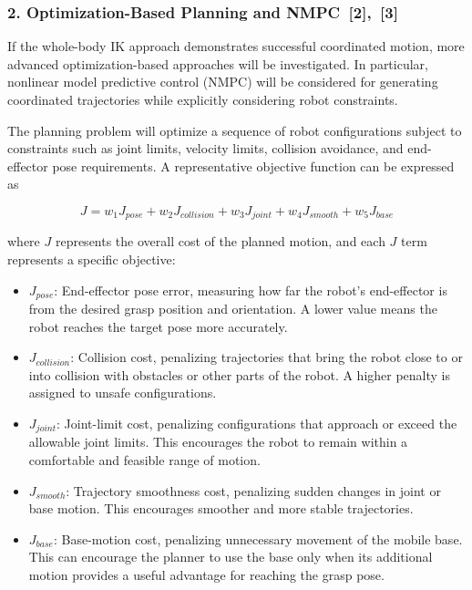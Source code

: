 \documentclass[12pt,a4paper]{article}
\begin{document}
\subsubsection*{2. Optimization-Based Planning and NMPC~[2],~[3]}

If the whole-body IK approach demonstrates successful coordinated motion, more advanced
optimization-based approaches will be investigated. In particular, nonlinear model predictive
control (NMPC) will be considered for generating coordinated trajectories while explicitly
considering robot constraints.

The planning problem will optimize a sequence of robot configurations subject to constraints
such as joint limits, velocity limits, collision avoidance, and end-effector pose requirements. A
representative objective function can be expressed as

\begin{equation}
J = w_1 J_{pose} + w_2 J_{collision} + w_3 J_{joint} + w_4 J_{smooth} + w_5 J_{base}
\end{equation}

where $J$ represents the overall cost of the planned motion, and each $J$ term represents a
specific objective:

\begin{itemize}
  \item $J_{pose}$: End-effector pose error, measuring how far the robot's end-effector is from the
        desired grasp position and orientation. A lower value means the robot reaches the
        target pose more accurately.
  \item $J_{collision}$: Collision cost, penalizing trajectories that bring the robot close to or into
        collision with obstacles or other parts of the robot. A higher penalty is assigned to
        unsafe configurations.
  \item $J_{joint}$: Joint-limit cost, penalizing configurations that approach or exceed the allowable
        joint limits. This encourages the robot to remain within a comfortable and feasible range
        of motion.
  \item $J_{smooth}$: Trajectory smoothness cost, penalizing sudden changes in joint or base motion.
        This encourages smoother and more stable trajectories.
  \item $J_{base}$: Base-motion cost, penalizing unnecessary movement of the mobile base. This can
        encourage the planner to use the base only when its additional motion provides a useful
        advantage for reaching the grasp pose.
\end{itemize}
\end{document}
